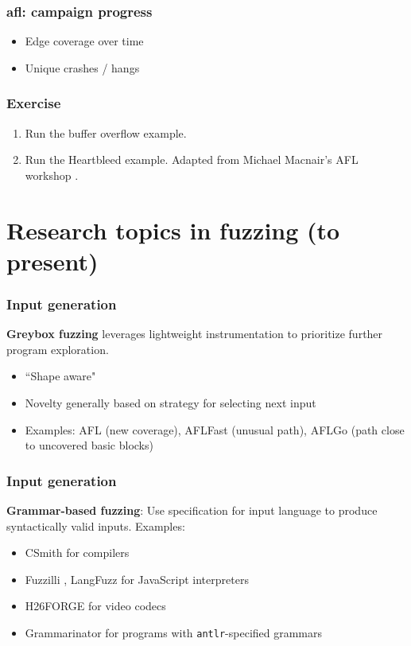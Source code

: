 \documentclass{beamer}
\begin{document}
\begin{frame}
	\frametitle{afl: campaign progress}
	\begin{itemize}
		\item{Edge coverage over time}
		\item{Unique crashes / hangs}
	\end{itemize}
\end{frame}

\begin{frame}
	\frametitle{Exercise}
	\begin{enumerate} 
		\item{Run the buffer overflow example.}
		\item{Run the Heartbleed example. Adapted from Michael Macnair's AFL workshop \cite{macnair}.}
	\end{enumerate}
\end{frame}

\section[Research topics]{Research topics in fuzzing \normalsize{(to present)}}

\begin{frame}
	\frametitle{Input generation}
	\textbf{Greybox fuzzing} leverages lightweight instrumentation to prioritize further program exploration. \begin{itemize}
		\item{``Shape aware"}
		\item{Novelty generally based on strategy for selecting next input}
		\item{Examples: AFL (new coverage), AFLFast \cite{aflfast} (unusual path), AFLGo \cite{aflgo} (path close to uncovered basic blocks)}
	\end{itemize}
\end{frame}

\begin{frame}
	\frametitle{Input generation}

	\textbf{Grammar-based fuzzing}: Use specification for input language to produce syntactically valid inputs. Examples: \begin{itemize}
		\item{CSmith \cite{csmith} for compilers}
		\item{Fuzzilli \cite{fuzzilli}, LangFuzz \cite{langfuzz} for JavaScript interpreters}
		\item{H26FORGE \cite{h26forge} for video codecs}
		\item{Grammarinator \cite{grammarinator} for programs with \texttt{antlr}-specified grammars}
	\end{itemize}

\end{frame}
\end{document}
